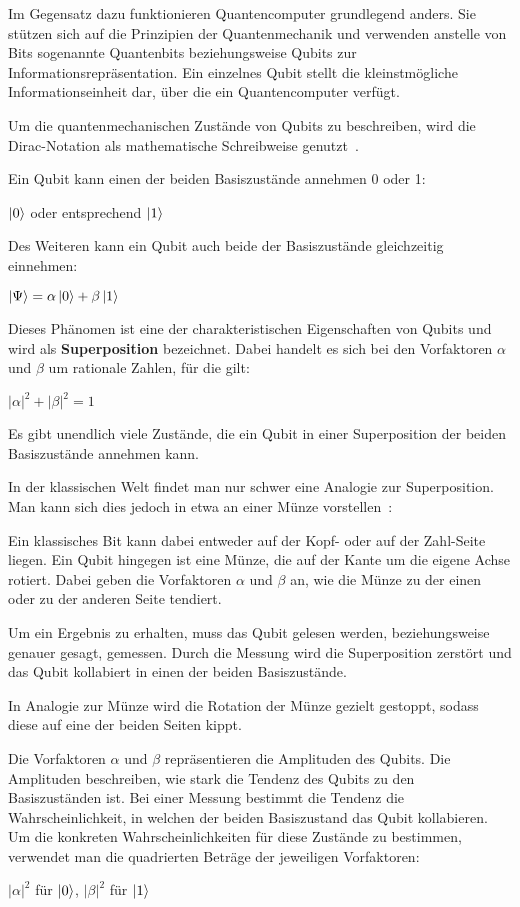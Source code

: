 Im Gegensatz dazu funktionieren Quantencomputer grundlegend anders. 
Sie stützen sich auf die Prinzipien der Quantenmechanik und 
verwenden anstelle von Bits sogenannte Quantenbits beziehungsweise Qubits zur Informationsrepräsentation. 
Ein einzelnes Qubit stellt die kleinstmögliche Informationseinheit dar, 
über die ein Quantencomputer verfügt.

Um die quantenmechanischen Zustände von Qubits zu beschreiben, 
wird die Dirac-Notation als mathematische Schreibweise genutzt~\cite{dirac_1939}.

Ein Qubit kann einen der beiden Basiszustände annehmen 0 oder  1:
\begin{center}
\(\ket{0}\) oder entsprechend \(\ket{1}\)
\end{center}

Des Weiteren kann ein Qubit auch beide der Basiszustände gleichzeitig einnehmen:
\begin{center}
\(\ket{\Psi} = \alpha\ket{0} + \beta\ket{1}\)
\end{center}
Dieses Phänomen ist eine der charakteristischen Eigenschaften von Qubits und wird als \textbf{Superposition} bezeichnet.
Dabei handelt es sich bei den Vorfaktoren \(\alpha\) und \(\beta\) um rationale Zahlen, 
für die gilt:
\begin{center}
\(\lvert\alpha\rvert^2 + \lvert\beta\rvert^2 = 1\)
\end{center} 


Es gibt unendlich viele Zustände, die ein Qubit in einer Superposition der beiden Basiszustände annehmen kann.

In der klassischen Welt findet man nur schwer eine Analogie zur Superposition. 
Man kann sich dies jedoch in etwa an einer Münze vorstellen~\cite{Hoever2023Münze}:

Ein klassisches Bit kann dabei entweder auf der Kopf- oder auf der Zahl-Seite liegen.
Ein Qubit hingegen ist eine Münze, 
die auf der Kante um die eigene Achse rotiert.
Dabei geben die Vorfaktoren \(\alpha\) und \(\beta\) an, 
wie die Münze zu der einen oder zu der anderen Seite tendiert.

Um ein Ergebnis zu erhalten, 
muss das Qubit gelesen werden, 
beziehungsweise genauer gesagt, gemessen.
Durch die Messung wird die Superposition zerstört und 
das Qubit kollabiert in einen der beiden Basiszustände.

In Analogie zur Münze wird die Rotation der Münze gezielt gestoppt, sodass diese auf eine der beiden Seiten kippt. 

Die Vorfaktoren \(\alpha\) und \(\beta\) repräsentieren die Amplituden des Qubits.
Die Amplituden beschreiben, 
wie stark die Tendenz des Qubits zu den Basiszuständen ist.
Bei einer Messung bestimmt die Tendenz die Wahrscheinlichkeit, 
in welchen der beiden Basiszustand das Qubit kollabieren.
Um die konkreten Wahrscheinlichkeiten für diese Zustände zu bestimmen, 
verwendet man die quadrierten Beträge der jeweiligen Vorfaktoren:
\begin{center}
\(\lvert\alpha\rvert^2\) für \(\ket{0}\), \(\lvert\beta\rvert^2\) für \(\ket{1}\)
\end{center}

